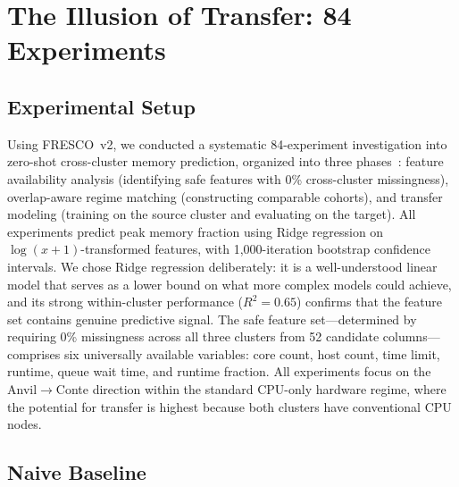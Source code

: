 \documentclass[sigconf]{acmart}
\begin{document}
\section{The Illusion of Transfer: 84 Experiments}

\subsection{Experimental Setup}

Using FRESCO~v2, we conducted a systematic 84-experiment investigation into zero-shot cross-cluster memory prediction, organized into three phases~\cite{mckerracher2025fresco}: feature availability analysis (identifying safe features with 0\% cross-cluster missingness), overlap-aware regime matching (constructing comparable cohorts), and transfer modeling (training on the source cluster and evaluating on the target).
All experiments predict peak memory fraction using Ridge regression on $\log(x+1)$-transformed features, with 1,000-iteration bootstrap confidence intervals.
We chose Ridge regression deliberately: it is a well-understood linear model that serves as a lower bound on what more complex models could achieve, and its strong within-cluster performance ($R^2 = 0.65$) confirms that the feature set contains genuine predictive signal.
The safe feature set---determined by requiring 0\% missingness across all three clusters from 52 candidate columns---comprises six universally available variables: core count, host count, time limit, runtime, queue wait time, and runtime fraction.
All experiments focus on the Anvil$\to$Conte direction within the standard CPU-only hardware regime, where the potential for transfer is highest because both clusters have conventional CPU nodes.

\subsection{Naive Baseline}
\end{document}
